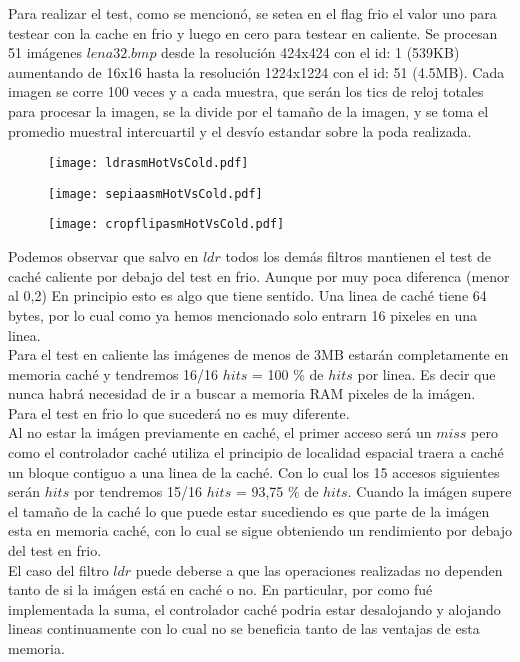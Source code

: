Para realizar el test, como se mencionó, se setea en el flag frio el valor uno para testear con la cache en frio y luego en cero para testear en caliente.
Se procesan 51 imágenes $lena32.bmp$ desde la resolución 424x424 con el id: 1 (539KB) aumentando de 16x16 hasta la resolución 1224x1224 con el id: 51 (4.5MB). Cada imagen se corre 100 veces y a cada muestra, que serán los tics de reloj totales para procesar la imagen, se la divide por el tamaño de la imagen, y se toma el promedio muestral intercuartil y el desvío estandar sobre la poda realizada.

\begin{figure}[h]
  \begin{center}
	\texttt{[image: ldrasmHotVsCold.pdf]}
  \end{center}
\end{figure}

\begin{figure}[h]
  \begin{center}
	\texttt{[image: sepiaasmHotVsCold.pdf]}
  \end{center}
\end{figure}

\begin{figure}[h]
  \begin{center}
	\texttt{[image: cropflipasmHotVsCold.pdf]}
  \end{center}
\end{figure}

Podemos observar que salvo en $ldr$ todos los demás filtros mantienen el test de caché caliente por debajo del test en frio. Aunque por muy poca diferenca (menor al 0,2)
En principio esto es algo que tiene sentido. Una linea de caché tiene 64 bytes, por lo cual como ya hemos mencionado solo entrarn 16 pixeles en una linea. \\

Para el test en caliente las imágenes de menos de 3MB estarán completamente en memoria caché y tendremos 16/16 $hits$ = 100 $\%$ de $hits$ por linea. Es decir que nunca habrá necesidad de ir a buscar a memoria RAM pixeles de la imágen.\\ 
Para el test en frio lo que sucederá no es muy diferente. \\

Al no estar la imágen previamente en caché, el primer acceso será un $miss$ pero como el controlador caché utiliza el principio de localidad espacial traera a caché un bloque contiguo a una linea de la caché. Con lo cual los 15 accesos siguientes serán $hits$ por tendremos 15/16 $hits$ = 93,75 $\%$ de $hits$. 
Cuando la imágen supere el tamaño de la caché lo que puede estar sucediendo es que parte de la imágen esta en memoria caché, con lo cual se sigue obteniendo un rendimiento por debajo del test en frio.\\

El caso del filtro $ldr$ puede deberse a que las operaciones realizadas no dependen tanto de si la imágen está en caché o no. En particular, por como fué implementada la suma, el controlador caché podria estar desalojando y alojando lineas continuamente con lo cual no se beneficia tanto de las ventajas de esta memoria.

